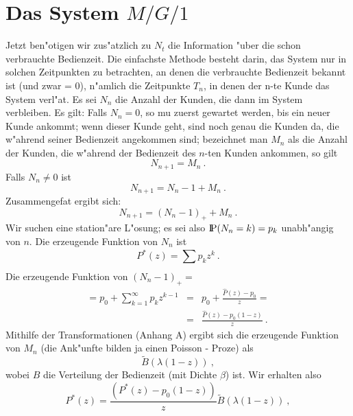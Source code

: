 \section{Das System $M/G/1$}
Jetzt ben"otigen wir zus"atzlich zu $N_{t}$ die Information "uber die
schon verbrauchte Bedienzeit. Die einfachste Methode besteht darin, das
System nur in solchen Zeitpunkten zu betrachten, an denen die verbrauchte
Bedienzeit bekannt ist (und zwar = 0), n"amlich die Zeitpunkte $T_{n}$, in
denen der n-te Kunde das System verl"a\3t. Es sei $N_{n}$ die Anzahl der
Kunden, die dann im System verbleiben. Es gilt: Falls $N_{n}=0$, so mu\3
zuerst gewartet werden, bis ein neuer Kunde ankommt; wenn dieser Kunde
geht, sind noch genau die Kunden da, die w"ahrend seiner Bedienzeit
angekommen sind; bezeichnet man $M_{n}$ als die Anzahl der Kunden, die
w"ahrend der Bedienzeit des $n$-ten Kunden ankommen, so gilt
\begin{displaymath}
N_{n+1} = M_{n} ~.
\end{displaymath}
Falls $N_{n} \not= 0$ ist
\begin{displaymath}
N_{n+1} = N_{n} - 1 + M_{n} ~.
\end{displaymath}
Zusammengefa\3t ergibt sich:
\begin{displaymath}
N_{n+1} = (N_{n} - 1)_{+} + M_{n} ~.
\end{displaymath}
Wir suchen eine station"are L"osung; es sei also ${\rm I\kern-0.2em P} (N_{n}=k)=p_{k}$
unabh"angig von $n$. Die erzeugende Funktion von $N_{n}$ ist
\begin{displaymath}
P^{*}(z) = \sum_{}^{}p_{k}z^{k} ~.
\end{displaymath}
Die erzeugende Funktion von $(N_{n}-1)_{+}=$
\begin{eqnarray*}
= p_{0} + \sum_{k=1}^{\infty} p_{k} z^{k-1} &=& p_{0}+ \frac{\hat P
(z) - p_{0}}{z} = \\
 &=& \frac{\hat P(z) - p_{0}(1-z)}{z} ~.
\end{eqnarray*} 
Mithilfe der Transformationen (Anhang A) ergibt sich die erzeugende Funktion von $M_{n}$
(die Ank"unfte bilden ja einen Poisson - Proze\3) als 
\begin{displaymath}
\tilde B (\lambda(1 - z)) ~,
\end{displaymath}
wobei $B$ die Verteilung der Bedienzeit (mit Dichte $\beta$) ist. Wir
erhalten also
\begin{displaymath}
P^{*}(z) = \frac{(P^{*}(z) - p_{0}(1-z))}{z}  \tilde B (\lambda(1-z)) ~,
\end{displaymath}
